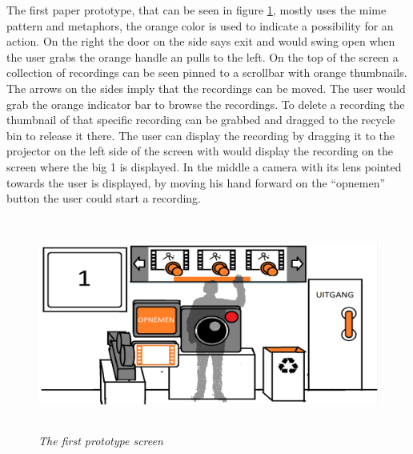
The first paper prototype, that can be seen in figure \ref{first prototype}, mostly uses the mime pattern and metaphors, the orange color is used to indicate a possibility for an action. On the right the door on the side says exit and would swing open when the user grabs the orange handle an pulls to the left. On the top of the screen a collection of recordings can be seen pinned to a scrollbar with orange thumbnails. The arrows on the sides imply that the recordings can be moved. The user would grab the orange indicator bar to browse the recordings. To delete a recording the thumbnail of that specific recording can be grabbed and dragged to the recycle bin to release it there. The user can display the recording by dragging it to the projector on the left side of the screen with would display the recording on the screen where the big 1 is displayed. In the middle a camera with its lens pointed towards the user is displayed, by moving his hand forward on the ``opnemen'' button the user could start a recording.\\

\begin{figure}[H]
	\begin{center}
		\includegraphics[width=12.5cm, height=7cm]{figures/prototype_1_1_standard.png}
		\caption{\emph{The first prototype screen}}
		\label{first prototype}
	\end{center}
\end{figure}

